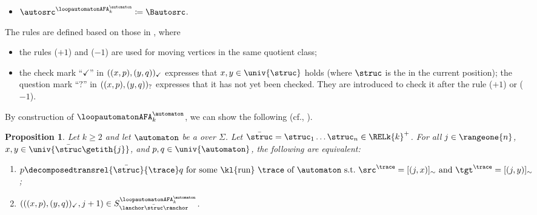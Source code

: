 \documentclass[10pt,a4paper]{article}
\newtheorem{proposition}[theorem]{Proposition}
\theoremstyle{definition}
\theoremstyle{remark}
\DeclarePairedDelimiter\tuple{(}{)}
\newcommand{\defeq}{\coloneq}
\newcommand{\mul}[1]{\bar{#1}}
\newcommand{\vsig}{\Sigma}
\begin{document}
\begin{defi}
\begin{itemize}
\begin{gather*}
            \tuple{\tuple{\tilde{p}, \tilde{q}}_{\checkmark}, \struc} ~\leadsto~ \tuple{\tuple{\tilde{p}, \tilde{q}}_{?}, +1} \tag{$+1$}\\
            \tuple{\tuple{\tilde{p}, \tilde{q}}_{\checkmark}, \struc} ~\leadsto~ \tuple{\tuple{\tilde{p}, \tilde{q}}_{?}, -1} \tag{$-1$}\\
            \tuple{\tuple{\tilde{p}, \tilde{q}}_{?}, \struc} ~\leadsto~
            \tuple{\tuple{\tilde{p}, \tilde{q}}_{\checkmark}, 0} \quad\text{ if $\tilde{p}, \tilde{q} \in \univ{\struc} \times \univ{\automaton}$} \tag{$\checkmark$}
        \end{gather*}
        \item $\autosrc^{\loopautomatonAFA_{k}^{\automaton}} \defeq \Bautosrc$.
    \end{itemize}
\end{defi}
The rules are defined based on those in , where
\begin{itemize}
    \item the rules ($+1$) and ($-1$) are used for moving vertices in the same quotient class;
    \item the check mark ``$\checkmark$'' in $\tuple{\tuple{x, p}, \tuple{y, q}}_{\checkmark}$ expresses that $x, y \in \univ{\struc}$ holds (where $\struc$ is the  in the current position);
    the question mark ``$?$'' in $\tuple{\tuple{x, p}, \tuple{y, q}}_{?}$ expresses that it has not yet been checked.
    They are introduced to check it after the rule ($+1$) or ($-1$).
\end{itemize}
By construction of $\loopautomatonAFA_{k}^{\automaton}$, we can show the following
(cf., \cite[Proposition 5.9]{nakamuraDerivativesGraphsPositive2025}).
\begin{proposition}\label{proposition: decomposition and 2AFA}
    Let $k \ge 2$ and let $\automaton$ be a  over $\vsig$.
    Let $\mul{\struc} = \struc_1 \dots \struc_n \in \RELk{k}^{+}$.
    For all $j \in \rangeone{n}$, $x, y \in \univ{\mul{\struc}\getith{j}}$, and $p, q \in \univ{\automaton}$, the following are equivalent:
    \begin{enumerate}
        \item \label{item: decomposition and 2AFA 1} $p\decomposedtransrel{\mul{\struc}}{\trace} q \mbox{ for some \kl{run} $\trace$ of $\automaton$ s.t.\ $\src^{\trace} = [\tuple{j,x}]_{\sim}$ and $\tgt^{\trace} = [\tuple{j,y}]_{\sim}$}$;
        \item \label{item: decomposition and 2AFA 2} $\tuple{\tuple{\tuple{x, p}, \tuple{y, q}}_{\checkmark}, j+1} \in S^{{\loopautomatonAFA_{k}^{\automaton}}}_{\lanchor \mul{\struc} \ranchor}$.
    \end{enumerate}
\end{proposition}
\end{document}
